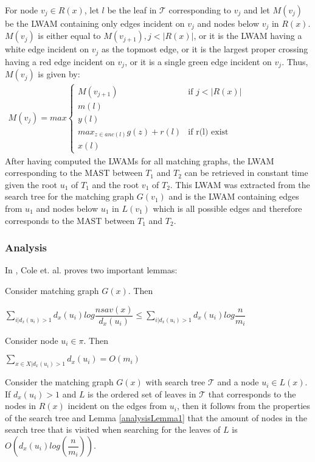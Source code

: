 For node $v_j \in R(x)$, let $l$ be the leaf in $\mathcal{T}$ corresponding to $v_j$ and let $M(v_j)$ be the LWAM containing only edges incident on $v_j$ and nodes below $v_j$ in $R(x)$. $M(v_j)$ is either equal to $M(v_{j+1}), j < |R(x)|$, or it is the LWAM having a white edge incident on $v_j$ as the topmost edge, or it is the largest proper crossing having a red edge incident on $v_j$, or it is a single green edge incident on $v_j$. Thus, $M(v_j)$ is given by:
\begin{equation*}
\begin{aligned}
M(v_j)=max
\begin{cases}
M(v_{j+1})						& \text{if $j < |R(x)|$}
\\
m(l)
\\
y(l)
\\
max_{z \in anc(l)} g(z) + r(l)	& \text{if r(l) exist}    
\\
x(l)         
\end{cases}
\end{aligned}
\phantom{\hspace{6cm}}
\end{equation*}
After having computed the LWAMs for all matching graphs, the LWAM corresponding to the MAST between $T_1$ and $T_2$ can be retrieved in constant time given the root $u_1$ of $T_1$ and the root $v_1$ of $T_2$. This LWAM was extracted from the search tree for the matching graph $G(v_1)$ and is the LWAM containing edges from $u_1$ and nodes below $u_1$ in $L(v_1)$ which is all possible edges and therefore corresponds to the MAST between $T_1$ and $T_2$.

\subsubsection{Analysis}
\label{lwam_analysis}
In \cite{nlogn}, Cole et. al. proves two important lemmas:

\begin{Lemma}
	Consider matching graph $G(x)$. Then
	
	$\sum_{i|d_x(u_i)>1} d_x(u_i)log\dfrac{nsav(x)}{d_x(u_i)} \le \sum_{i|d_x(u_i)>1} d_x(u_i)log\dfrac{n}{m_i}$
	\label{analysisLemma1}
\end{Lemma}
\begin{Lemma}
	Consider node $u_i \in \pi$. Then
	
	$\sum_{x \in X | d_x(u_i)>1} d_x(u_i) = O(m_i)$
	\label{analysisLemma2}
\end{Lemma}

\noindent Consider the matching graph $G(x)$ with search tree $\mathcal{T}$ and a node $u_i \in L(x)$. If $d_x(u_i) > 1$ and $L$ is the ordered set of leaves in $\mathcal{T}$ that corresponds to the nodes in $R(x)$ incident on the edges from $u_i$, then it follows from the properties of the search tree and Lemma \ref{analysisLemma1} that the amount of nodes in the search tree that is visited when searching for the leaves of $L$ is $O(d_x(u_i)log(\dfrac{n}{m_i}))$.

